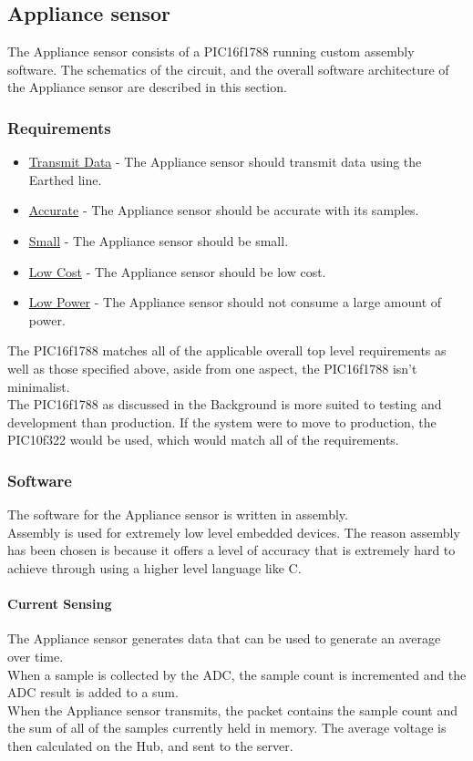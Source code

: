 \documentclass[draft,preprint,12pt,3p]{elsarticle}
\begin{document}
\subsection{Appliance sensor}
The Appliance sensor consists of a PIC16f1788 running custom assembly software. The schematics of the circuit, and the overall software architecture of the Appliance sensor are described in this section.

\subsubsection{Requirements}
\begin{itemize}
\item \underline{Transmit Data} - The Appliance sensor should transmit data using the Earthed line.
\item \underline{Accurate} - The Appliance sensor should be accurate with its samples.
\item \underline{Small} - The Appliance sensor should be small.
\item \underline{Low Cost} - The Appliance sensor should be low cost.
\item \underline{Low Power} - The Appliance sensor should not consume a large amount of power.
\end{itemize}
The PIC16f1788 matches all of the applicable overall top level requirements as well as those specified above, aside from one aspect, the PIC16f1788 isn't minimalist.\\
The PIC16f1788 as discussed in the Background is more suited to testing and development than production. If the system were to move to production, the PIC10f322 would be used, which would match all of the requirements.

\subsubsection{Software}
The software for the Appliance sensor is written in assembly.\\
Assembly is used for extremely low level embedded devices. The reason assembly has been chosen is because it offers a level of accuracy that is extremely hard to achieve through using a higher level language like C.\\

\paragraph{Current Sensing}
The Appliance sensor generates data that can be used to generate an average over time.\\
When a sample is collected by the ADC, the sample count is incremented and the ADC result is added to a sum.\\
When the Appliance sensor transmits, the packet contains the sample count and the sum of all of the samples currently held in memory. The average voltage is then calculated on the Hub, and sent to the server.
\end{document}

